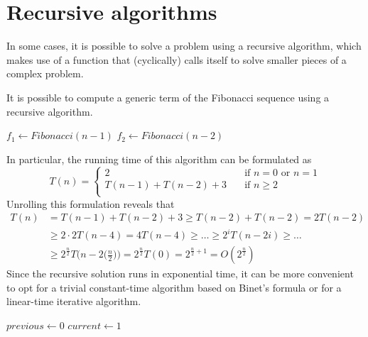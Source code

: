 \documentclass{report}
\begin{document}
\section{Recursive algorithms}
In some cases, it is possible to solve a problem using a recursive algorithm, which makes use of a function that (cyclically) calls itself to solve smaller pieces of a complex problem.
\begin{examplebox}
    It is possible to compute a generic term of the Fibonacci sequence using a recursive algorithm.
    \begin{algorithm}[H]
        
        $f_1 \gets Fibonacci(n - 1)$\;
        $f_2 \gets Fibonacci(n - 2)$\;
        \;
    \end{algorithm}
    \noindent In particular, the running time of this algorithm can be formulated as
    \[T(n) = \begin{cases}
        2 &\quad\text{if $n = 0$ or $n = 1$} \\
        T(n - 1) + T(n - 2) + 3 &\quad\text{if $n \ge 2$} \\
    \end{cases}\]
    Unrolling this formulation reveals that
    \begin{align*}
        T(n)
            &= T(n - 1) + T(n - 2) + 3 \ge T(n - 2) + T(n - 2) = 2T(n - 2) \\
            &\ge 2 \cdot 2T(n - 4) = 4T(n - 4) \ge \dots \ge 2^iT(n - 2i) \ge \dots \\
            &\ge 2^{\frac{n}{2}}T\bigg(n - 2\bigg(\frac{n}{2}\bigg)\bigg) = 2^{\frac{n}{2}}T(0) = 2^{\frac{n}{2} + 1} = O(2^{\frac{n}{2}})
    \end{align*}
    Since the recursive solution runs in exponential time, it can be more convenient to opt for a trivial constant-time algorithm based on Binet's formula or for a linear-time iterative algorithm.
    \begin{algorithm}[H]
        
        $previous \gets0$\;
        $current \gets 1$\;
        \;
    \end{algorithm}
\end{examplebox}
\end{document}
